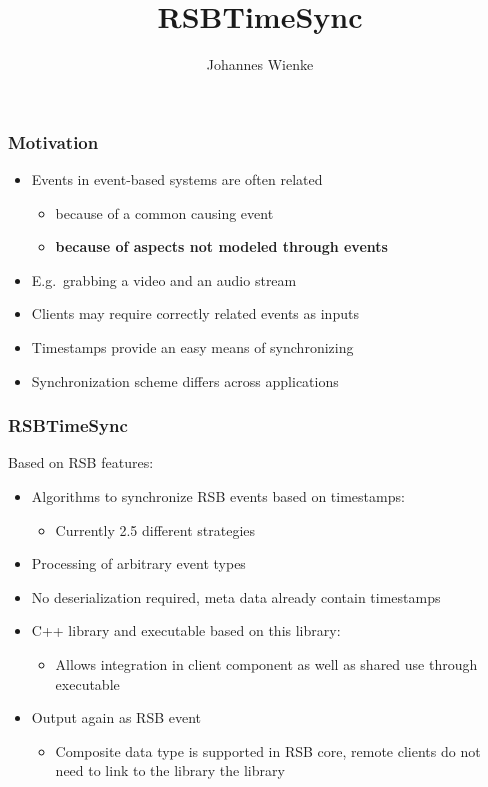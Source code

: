 \documentclass{beamer}
\title{RSBTimeSync}
\author{Johannes Wienke}
\institute{Bielefeld University}
\begin{document}
\begin{frame}
	\titlepage
\end{frame}

\begin{frame}
	\frametitle{Motivation}
	\begin{itemize}
        \item Events in event-based systems are often related
            \begin{itemize}
                \item because of a common causing event
                \item \textbf{because of aspects not modeled through events}
            \end{itemize}
        \item E.g.\ grabbing a video and an audio stream
        \item Clients may require correctly related events as inputs 
        \item Timestamps provide an easy means of synchronizing
        \item Synchronization scheme differs across applications
    \end{itemize}
\end{frame}

\begin{frame}
    \frametitle{RSBTimeSync}
    Based on RSB features:
    \begin{itemize}
        \item Algorithms to synchronize RSB events based on timestamps:
            \begin{itemize}
                \item Currently 2.5 different strategies
            \end{itemize}
        \item Processing of arbitrary event types
        \item No deserialization required, meta data already contain timestamps
        \item C++ library and executable based on this library:
            \begin{itemize}
                \item Allows integration in client component as well as shared use through executable
            \end{itemize}
        \item Output again as RSB event
            \begin{itemize}
                \item Composite data type is supported in RSB core, remote clients do not need to link to the library the library
            \end{itemize}
    \end{itemize}
\end{frame}
\end{document}
